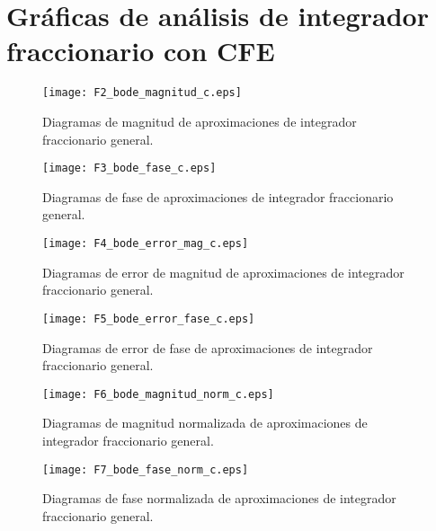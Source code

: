 \chapter{Gráficas de análisis de integrador fraccionario con CFE}

\begin{figure}[hbtp]
	\caption{Diagramas de magnitud de aproximaciones de integrador fraccionario general.}
	\centering
	\texttt{[image: F2\_bode\_magnitud\_c.eps]}
	\label{fig:analisis_mag}
\end{figure}

\begin{figure}[hbtp]
	\caption{Diagramas de fase de aproximaciones de integrador fraccionario general.}
	\centering
	\texttt{[image: F3\_bode\_fase\_c.eps]}
	\label{fig:analisis_fase}
\end{figure}

\begin{figure}[hbtp]
	\caption{Diagramas de error de magnitud de aproximaciones de integrador fraccionario general.}
	\centering
	\texttt{[image: F4\_bode\_error\_mag\_c.eps]}
	\label{fig:analisis_error_mag}
\end{figure}

\begin{figure}[hbtp]
	\caption{Diagramas de error de fase de aproximaciones de integrador fraccionario general.}
	\centering
	\texttt{[image: F5\_bode\_error\_fase\_c.eps]}
	\label{fig:analisis_error_fase}
\end{figure}

\begin{figure}[hbtp]
	\caption{Diagramas de magnitud normalizada de aproximaciones de integrador fraccionario general.}
	\centering
	\texttt{[image: F6\_bode\_magnitud\_norm\_c.eps]}
	\label{fig:analisis_mag_norm}
\end{figure}

\begin{figure}[hbtp]
	\caption{Diagramas de fase normalizada de aproximaciones de integrador fraccionario general.}
	\centering
	\texttt{[image: F7\_bode\_fase\_norm\_c.eps]}
	\label{fig:analisis_fase_norm}
\end{figure}

